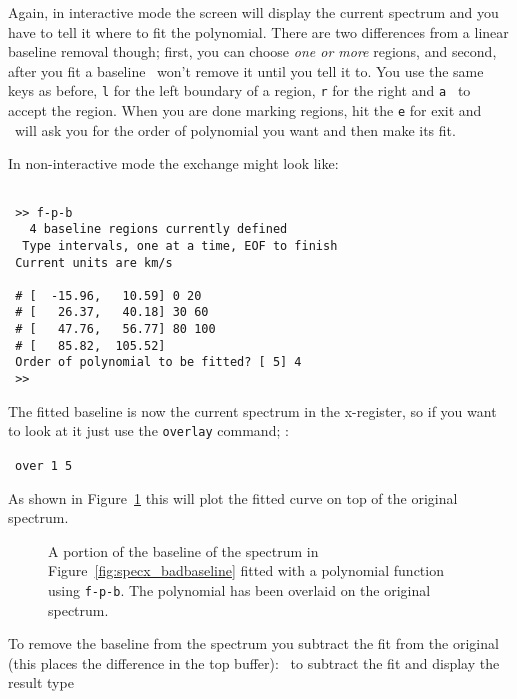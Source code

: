 Again, in interactive mode the screen will display the current
spectrum and you have to tell it where to fit the polynomial.  There
are two differences from a linear baseline removal though; first, you
can choose {\it one or more} regions, and second, after you fit a 
baseline \SPECX\
won't remove it until you tell it to.  You use the same keys as
before, {\tt l} for the left boundary of a region, {\tt r} for the
right and {\tt a } to accept the region. When you are done marking
regions, hit the {\tt e} for exit and \SPECX\ will ask you for the
order of polynomial you want and then make its fit. 

In non-interactive mode the exchange might look like:
\begin{verbatim}

 >> f-p-b
   4 baseline regions currently defined
  Type intervals, one at a time, EOF to finish
 Current units are km/s  
 
 # [  -15.96,   10.59] 0 20
 # [   26.37,   40.18] 30 60
 # [   47.76,   56.77] 80 100
 # [   85.82,  105.52]  
 Order of polynomial to be fitted? [ 5] 4
 >> 
\end{verbatim}

The fitted baseline is now the current spectrum in the x-register, so if
you want to
look at it just use the {\tt overlay} command; \eg :

\SP\ \verb|over 1 5|

As shown in Figure~\ref{fig:specx_fpb} this will plot the fitted curve
on top of the original spectrum. 

\begin{figure}[htb]
\centering
\leavevmode
\epsfysize=3.2in
\vspace*{-0.5cm}
\begin{center}
\begin{minipage}[t]{5in}
\caption[A polynomial baseline fit]
{\small{A portion of the baseline of the spectrum in
Figure~\ref{fig:specx_badbaseline} fitted with a polynomial function
using {\tt f-p-b}. The polynomial has been overlaid on the original
spectrum.  }}
\label{fig:specx_fpb}
\end{minipage}
\end{center}
\end{figure}

To remove the baseline from the spectrum you subtract the fit from the
original (this places the difference in the top buffer): \ie\ to
subtract the fit and display the result type

